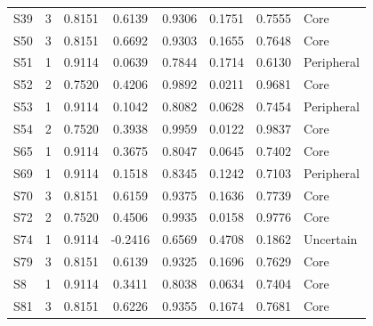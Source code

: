 {\begin{longtable}{@{}lccccccl@{}}
  S39 & 3 & 0.8151 & 0.6139 & 0.9306 & 0.1751 & 0.7555 & Core \\
  S50 & 3 & 0.8151 & 0.6692 & 0.9303 & 0.1655 & 0.7648 & Core \\
  S51 & 1 & 0.9114 & 0.0639 & 0.7844 & 0.1714 & 0.6130 & Peripheral \\
  S52 & 2 & 0.7520 & 0.4206 & 0.9892 & 0.0211 & 0.9681 & Core \\
  S53 & 1 & 0.9114 & 0.1042 & 0.8082 & 0.0628 & 0.7454 & Peripheral \\
  S54 & 2 & 0.7520 & 0.3938 & 0.9959 & 0.0122 & 0.9837 & Core \\
  S65 & 1 & 0.9114 & 0.3675 & 0.8047 & 0.0645 & 0.7402 & Core \\
  S69 & 1 & 0.9114 & 0.1518 & 0.8345 & 0.1242 & 0.7103 & Peripheral \\
  S70 & 3 & 0.8151 & 0.6159 & 0.9375 & 0.1636 & 0.7739 & Core \\
  S72 & 2 & 0.7520 & 0.4506 & 0.9935 & 0.0158 & 0.9776 & Core \\
  S74 & 1 & 0.9114 & -0.2416 & 0.6569 & 0.4708 & 0.1862 & Uncertain \\
  S79 & 3 & 0.8151 & 0.6139 & 0.9325 & 0.1696 & 0.7629 & Core \\
  S8 & 1 & 0.9114 & 0.3411 & 0.8038 & 0.0634 & 0.7404 & Core \\
  S81 & 3 & 0.8151 & 0.6226 & 0.9355 & 0.1674 & 0.7681 & Core \\
\end{longtable}
}
